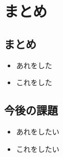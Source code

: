\documentclass[compress,dvipdfmx,11pt]{beamer}
\begin{document}
\section{まとめ}
\label{sec:orgb176bab}

\subsection{まとめ}
\label{sec:orgd4af35c}

\begin{itemize}
\item あれをした
\item これをした
\end{itemize}

\subsection{今後の課題}
\label{sec:org85c2ab4}

\begin{itemize}
\item あれをしたい
\item これをしたい
\end{itemize}
\end{document}
